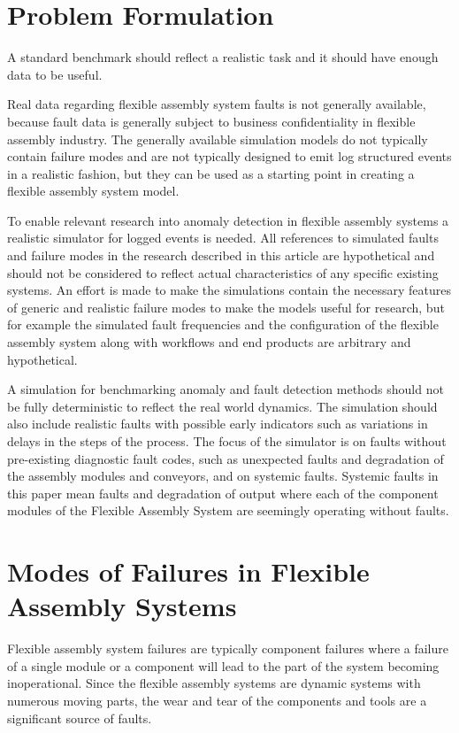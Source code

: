 \documentclass[journal]{IEEEtran}
\begin{document}
\section{Problem Formulation}

A standard benchmark should reflect a realistic task and it should have enough data to be useful.

Real data regarding flexible assembly system faults is
not generally available, because fault data is generally subject to business confidentiality in flexible assembly industry.
The generally available simulation models do not typically contain failure modes and are not typically designed to emit
log structured events in a realistic fashion, but they can be used as a starting point in creating a flexible assembly system model.

To enable relevant research into anomaly detection in flexible assembly systems a realistic simulator for logged events is needed.
All references to simulated faults and failure modes in the research described in this article are hypothetical and should not be considered to
reflect actual characteristics of any specific existing systems. An effort is made to make the simulations contain the necessary features of
generic and realistic failure modes to make the models useful for research, but for example the simulated fault frequencies and the configuration
of the flexible assembly system along with workflows and end products are arbitrary and hypothetical.

A simulation for benchmarking anomaly and fault detection methods should not be fully deterministic to reflect the real world dynamics. The simulation should also
include realistic faults with possible early indicators such as variations in delays in the steps of the process. The focus of the simulator is on faults without pre-existing
diagnostic fault codes, such as unexpected faults and degradation of the assembly modules and conveyors, and on systemic faults. Systemic faults in this paper
mean faults and degradation of output where each of the component modules of the Flexible Assembly System are seemingly operating without faults.

\section{Modes of Failures in Flexible Assembly Systems}

Flexible assembly system failures are typically component failures where a failure of a single module or a component will lead to the part of the system becoming inoperational.
Since the flexible assembly systems are dynamic systems with numerous moving parts, the wear and tear of the components and tools are a significant source of faults.
\end{document}
